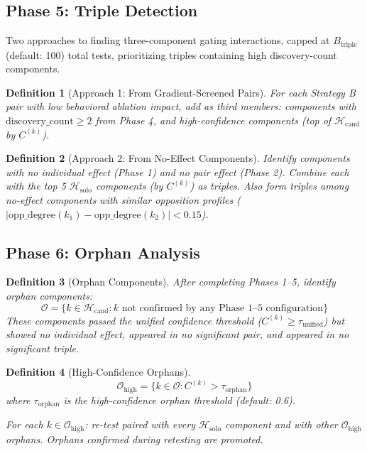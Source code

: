 \documentclass[11pt]{article}
\newtheorem{definition}{Definition}[section]
\begin{document}
\subsection{Phase 5: Triple Detection}

Two approaches to finding three-component gating interactions, capped at $B_{\text{triple}}$ (default: 100) total tests, prioritizing triples containing high discovery-count components.

\begin{definition}[Approach 1: From Gradient-Screened Pairs]
For each Strategy B pair with low behavioral ablation impact, add as third members: components with $\text{discovery\_count} \geq 2$ from Phase 4, and high-confidence components (top of $\mathcal{H}_{\text{cand}}$ by $C^{(k)}$).
\end{definition}

\begin{definition}[Approach 2: From No-Effect Components]
Identify components with no individual effect (Phase 1) and no pair effect (Phase 2). Combine each with the top 5 $\mathcal{H}_{\text{solo}}$ components (by $C^{(k)}$) as triples. Also form triples among no-effect components with similar opposition profiles ($|\text{opp\_degree}(k_1) - \text{opp\_degree}(k_2)| < 0.15$).
\end{definition}

\subsection{Phase 6: Orphan Analysis}

\begin{definition}[Orphan Components]
After completing Phases 1--5, identify orphan components:
\begin{equation}
\mathcal{O} = \{k \in \mathcal{H}_{\text{cand}} : k \text{ not confirmed by any Phase 1--5 configuration}\}
\end{equation}
These components passed the unified confidence threshold ($C^{(k)} \geq \tau_{\text{unified}}$) but showed no individual effect, appeared in no significant pair, and appeared in no significant triple.
\end{definition}

\begin{definition}[High-Confidence Orphans]
\begin{equation}
\mathcal{O}_{\text{high}} = \{k \in \mathcal{O} : C^{(k)} > \tau_{\text{orphan}}\}
\end{equation}
where $\tau_{\text{orphan}}$ is the high-confidence orphan threshold (default: 0.6).

For each $k \in \mathcal{O}_{\text{high}}$: re-test paired with every $\mathcal{H}_{\text{solo}}$ component and with other $\mathcal{O}_{\text{high}}$ orphans. Orphans confirmed during retesting are promoted.
\end{definition}
\end{document}

